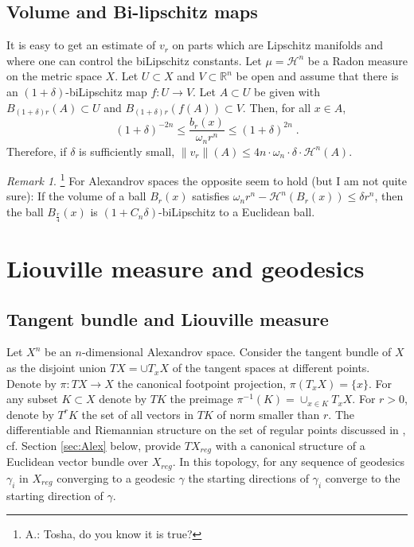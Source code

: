 \documentclass[12pt,leqno]{amsart}
\numberwithin{equation}{section}
\theoremstyle{definition}
\theoremstyle{remark}
\newtheorem{rem}[thm]{Remark}
\newcommand{\R}{\mathbb{R}}
\def\:{\colon}
\begin{document}
\subsection{Volume and Bi-lipschitz maps}
It is easy to get an estimate of $v_r$  on parts which are Lipschitz manifolds and where one can control the biLipschitz constants.
Let $\mu =\mathcal H^n$ be a Radon measure on the metric space $X$.
Let $U\subset X$ and $V\subset \R^n$ be open and assume that there is an $(1+\delta)$-biLipschitz map
$f\:U \to V$.  %
 Let $A\subset U$ be given with
$B_{(1+\delta) r} (A) \subset U$ and $B_{(1+\delta) r} (f(A)) \subset V$.  Then, for all $x\in A$,
\begin{equation} \label{eq:bilip}
(1+\delta)  ^{-2n} \leq \frac {b_r(x)} {\omega _n r^n} \leq (1+\delta ) ^{2n} \; .
\end{equation}
Therefore, if $\delta $ is sufficiently small,  $\|v_r \| (A) \leq  4 n \cdot \omega _n \cdot  \delta \cdot \mathcal H^n (A).$
\begin{rem}  \footnote{A.: Tosha, do you know it is true?} For Alexandrov  spaces the opposite seem to hold (but I am not quite sure):
If the volume of  a ball $B_r (x)$ satisfies $\omega _n r^n -\mathcal H^n (B_r (x)) \leq \delta r ^n$, then
the ball $B_{\frac r 4} (x)$ is  $(1+C_n \delta )$-biLipschitz  to a Euclidean ball.
\end{rem}





\section{Liouville measure and geodesics} \label{sec:Liou}
\subsection{Tangent bundle and Liouville measure} \label{subsec:tb}
Let $X^n$ be an $n$-dimensional Alexandrov space. Consider the tangent bundle of $X$
  as the  disjoint union $TX=\cup T_x X$ of the tangent spaces at different points. Denote by $\pi\:TX\to X$ the canonical footpoint projection, $\pi (T_xX) =\{x\}$.
	For any subset $K\subset X$ denote by $TK$ the preimage $\pi^{-1} (K)= \cup _{x\in K} T_xX$. For $r>0$, denote by $T^r K$ the set of all vectors in $TK$
	of norm smaller than $r$.
 The   differentiable and Riemannian structure on the set of regular points discussed in \cite{Otsu}, cf. Section \ref{sec:Alex} below,  provide  $TX_{reg}$ with a canonical structure of a Euclidean vector bundle over $X_{reg}$. In this topology, for any sequence of geodesics $\gamma _i$ in $X_{reg}$ converging to a geodesic $\gamma$ the starting directions of $\gamma _i$ converge to the starting direction of $\gamma$.
\end{document}

